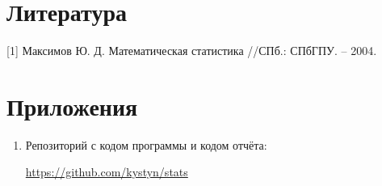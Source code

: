 \section{Литература}
[1] Максимов Ю. Д. Математическая статистика //СПб.: СПбГПУ. – 2004. \label{tyrsin}



\section{Приложения}

\begin{enumerate}
	\item Репозиторий с кодом программы и кодом отчёта:
	
	\href{https://github.com/kystyn/stats}{https://github.com/kystyn/stats}
\end{enumerate}
